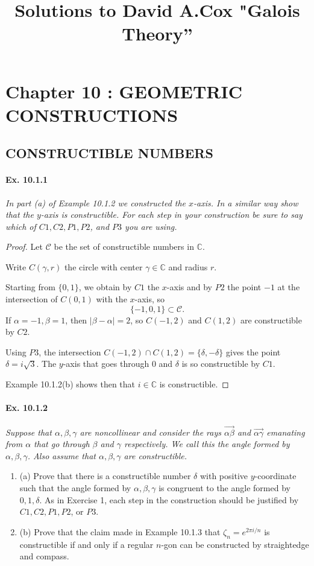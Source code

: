 \documentclass[11pt,a4paper]{article}
\title{Solutions to David A.Cox  "Galois Theory''}
\newcommand{\be} {\begin{enumerate}}
\newcommand{\ee} {\end{enumerate}}
\newcommand{\C}{\mathbb{C}}
\begin{document}
\section{Chapter 10 : GEOMETRIC CONSTRUCTIONS}

\subsection{CONSTRUCTIBLE NUMBERS}

\paragraph{Ex. 10.1.1}

{\it In part (a) of Example 10.1.2 we constructed the $x$-axis. In a similar way show that the $y$-axis is constructible. For each step in your construction be sure to say which of $C1,C2,P1,P2$, and $P3$ you are using.
}

\begin{proof}
Let $ \mathscr{C}$ be the set of constructible numbers in $\C$.

Write $C(\gamma,r)$ the circle with center $\gamma \in \C$ and radius $r$.

Starting from $ \{0,1\}$, we obtain by $C1$ the $x$-axis and by $P2$ the point $-1$ at the intersection of $C(0,1)$ with the $x$-axis, so
$$ \{-1,0,1\} \subset {\mathscr{C}}.$$
If $\alpha = -1, \beta = 1$, then $|\beta - \alpha| = 2$, so $C(-1,2)$ and $C(1,2)$ are constructible by $C2$.

Using $P3$, the intersection $C(-1,2) \cap C(1,2)=\{\delta, - \delta\}$ gives the point $\delta = i\sqrt{3}$. The $y$-axis that goes through $0$ and $\delta$ is so constructible by $C1$.

Example 10.1.2(b) shows then that $i \in \C$ is  constructible. 
\end{proof}

\paragraph{Ex. 10.1.2}

{\it Suppose that $\alpha,\beta,\gamma$ are noncollinear and consider the rays $\overrightarrow{\alpha \beta}$ and $\overrightarrow{\alpha \gamma}$ emanating from $\alpha$ that go through $\beta$ and $\gamma$ respectively. We call this the angle formed by $\alpha,\beta,\gamma$. Also assume that $\alpha, \beta,\gamma$ are constructible.
\be
\item[(a)] Prove that there is a constructible number $\delta$ with positive $y$-coordinate such that the angle formed by $\alpha,\beta,\gamma$ is congruent to the angle formed by $0,1,\delta$. As in Exercise 1, each step in the construction should be justified by $C1,C2,P1,P2$, or $P3$.
\item[(b)] Prove that the claim made in Example 10.1.3 that $\zeta_n = e^{2\pi i/n}$ is constructible if and only if a regular $n$-gon can be constructed by straightedge and compass.
\ee
}
\end{document}
